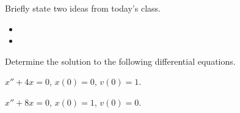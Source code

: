 \postClass

\begin{problem}
\item Briefly state two ideas from today's class.
  \begin{itemize}
  \item 
  \item 
  \end{itemize}
\item 
  \begin{subproblem}
    \item
  \end{subproblem}
\end{problem}


\begin{problem}
\item Determine the solution to the following differential equations.
  \begin{subproblem}
  \item $x'' + 4 x  =  0$, $x(0)=0$, $v(0)=1$.
    \vfill
  \item $x'' + 8 x  =  0$, $x(0)=1$, $v(0)=0$.
    \vfill
  \end{subproblem}
\end{problem}


